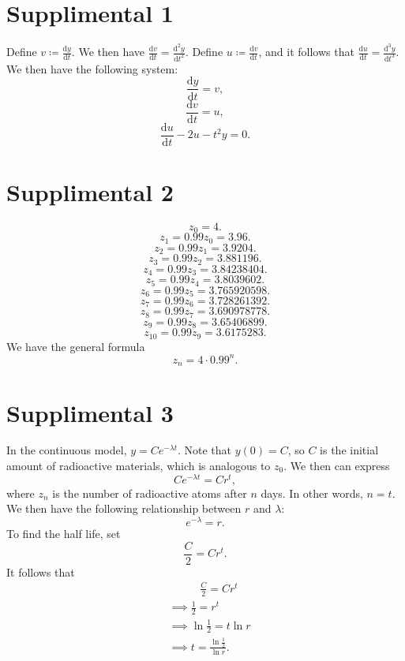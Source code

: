 \documentclass[11pt, letterpaper]{report}
\begin{document}
\section*{Supplimental 1}
Define $v\coloneqq \frac{\mathrm{d}y}{\mathrm{d}t} $. We then have $\frac{\mathrm{d}v}{\mathrm{d}t} =\frac{\mathrm{d}^2y}{\mathrm{d}t^2} $. Define $u\coloneqq \frac{\mathrm{d}v}{\mathrm{d}t} $, and it follows that $\frac{\mathrm{d}u}{\mathrm{d}t} = \frac{\mathrm{d}^3y}{\mathrm{d}t^3} $. We then have the following system:
\[
	\frac{\mathrm{d}y}{\mathrm{d}t} =v
,\]
\[
	\frac{\mathrm{d}v}{\mathrm{d}t} =u
,\]
\[
	\frac{\mathrm{d}u}{\mathrm{d}t} -2u-t^2y=0
.\]



\section*{Supplimental 2}
\[
	z_0=4
.\]
\[
	z_1=0.99z_0=3.96
.\]
\[
	z_2=0.99z_1=3.9204
.\]
\[
	z_3=0.99z_2=3.881196
.\]
\[
	z_4=0.99z_3=3.84238404
.\]
\[
	z_5=0.99z_4=3.8039602
.\]
\[
	z_6=0.99z_5=3.765920598
.\]
\[
	z_7=0.99z_6=3.728261392
.\]
\[
	z_8=0.99z_7=3.690978778
.\]
\[
	z_9=0.99z_8=3.65406899
.\]
\[
	z_{10}=0.99z_9=3.6175283
.\]
We have the general formula
\[
	z_n=4\cdot 0.99^n
.\]

\section*{Supplimental 3}
In the continuous model, $y=Ce^{-\lambda t }$. Note that $y(0)=C$, so $C$ is the initial amount of radioactive materials, which is analogous to $z_0$. We then can express
\[
	Ce^{-\lambda t}= Cr^{t}
,\]
where $z_n$ is the number of radioactive atoms after $n$ days. In other words, $n=t$. We then have the following relationship between $r$ and $\lambda $:
\[
	e^{-\lambda }=r
.\]
To find the half life, set
\[
	\frac{C}{2}=Cr^t
.\]
It follows that
\begin{align*}
	&\qquad\;\;\;\frac{C}{2}=Cr^t\\
	&\implies \frac{1}{2}=r^t\\
	&\implies \ln \frac{1}{2}=t\ln r\\
	&\implies t=\frac{\ln \frac{1}{2}}{\ln r} 
.\end{align*}
\end{document}
